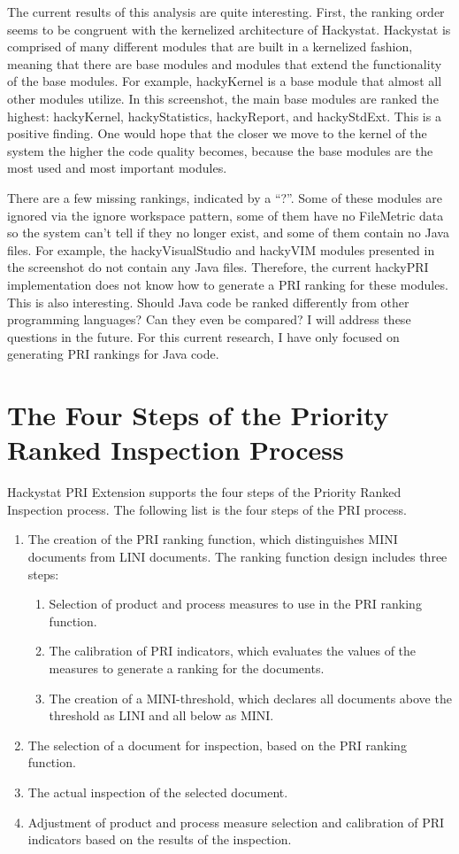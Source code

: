 The current results of this analysis are quite interesting. First, the
ranking order seems to be congruent with the kernelized architecture of
Hackystat. Hackystat is comprised of many different modules that are built
in a kernelized fashion, meaning that there are base modules and modules
that extend the functionality of the base modules. For example, hackyKernel
is a base module that almost all other modules utilize. In this screenshot,
the main base modules are ranked the highest: hackyKernel, hackyStatistics,
hackyReport, and hackyStdExt. This is a positive finding. One would hope
that the closer we move to the kernel of the system the higher the code
quality becomes, because the base modules are the most used and most
important modules.

There are a few missing rankings, indicated by a ``?''. Some of these
modules are ignored via the ignore workspace pattern, some of them have no
FileMetric data so the system can't tell if they no longer exist, and some
of them contain no Java files. For example, the hackyVisualStudio and
hackyVIM modules presented in the screenshot do not contain any Java files.
Therefore, the current hackyPRI implementation does not know how to
generate a PRI ranking for these modules. This is also interesting. Should
Java code be ranked differently from other programming languages? Can they
even be compared? I will address these questions in the future. For this
current research, I have only focused on generating PRI rankings for Java
code.



\clearpage
\section{The Four Steps of the Priority Ranked Inspection Process}
\label{section:foursteps}
Hackystat PRI Extension supports the four steps of the Priority Ranked
Inspection process. The following list is the four steps of the PRI
process.

\begin{enumerate}
\item The creation of the PRI ranking function, which distinguishes MINI
  documents from LINI documents. The ranking function design includes three
  steps:
\begin{enumerate}
\item Selection of product and process measures to use in the PRI
  ranking function.
\item The calibration of PRI indicators, which evaluates the values of the
  measures to generate a ranking for the documents.
\item The creation of a MINI-threshold, which declares all documents above
  the threshold as LINI and all below as MINI.
\end{enumerate}
\item The selection of a document for inspection, based on the PRI ranking
  function. 
\item The actual inspection of the selected document.
\item Adjustment of product and process measure selection and calibration
  of PRI indicators based on the results of the inspection.
\end{enumerate}

